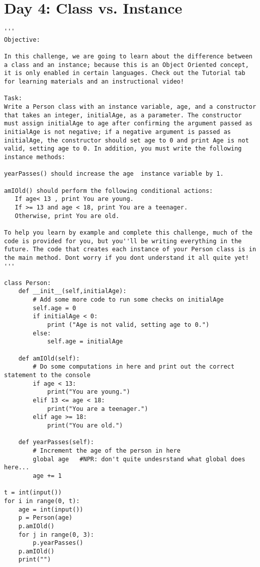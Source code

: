 \documentclass[11pt,a4paper]{article}
\begin{document}
\newpage
\section{Day 4: Class vs. Instance}
\begin{lstlisting}
'''
Objective:

In this challenge, we are going to learn about the difference between a class and an instance; because this is an Object Oriented concept, it is only enabled in certain languages. Check out the Tutorial tab for learning materials and an instructional video!

Task: 
Write a Person class with an instance variable, age, and a constructor that takes an integer, initialAge, as a parameter. The constructor must assign initialAge to age after confirming the argument passed as initialAge is not negative; if a negative argument is passed as initialAge, the constructor should set age to 0 and print Age is not valid, setting age to 0. In addition, you must write the following instance methods:

yearPasses() should increase the age  instance variable by 1.

amIOld() should perform the following conditional actions:
   If age< 13 , print You are young.
   If >= 13 and age < 18, print You are a teenager.
   Otherwise, print You are old.

To help you learn by example and complete this challenge, much of the code is provided for you, but you''ll be writing everything in the future. The code that creates each instance of your Person class is in the main method. Dont worry if you dont understand it all quite yet!
'''

class Person:
    def __init__(self,initialAge):
        # Add some more code to run some checks on initialAge
        self.age = 0
        if initialAge < 0:
            print ("Age is not valid, setting age to 0.")
        else:
            self.age = initialAge
            
    def amIOld(self):
        # Do some computations in here and print out the correct statement to the console
        if age < 13:
            print("You are young.")
        elif 13 <= age < 18:
            print("You are a teenager.")
        elif age >= 18:
            print("You are old.")
        
    def yearPasses(self):
        # Increment the age of the person in here
        global age   #NPR: don't quite undesrstand what global does here...
        age += 1

t = int(input())
for i in range(0, t):
    age = int(input())         
    p = Person(age)  
    p.amIOld()
    for j in range(0, 3):
        p.yearPasses()       
    p.amIOld()
    print("")
\end{lstlisting}
\end{document}
